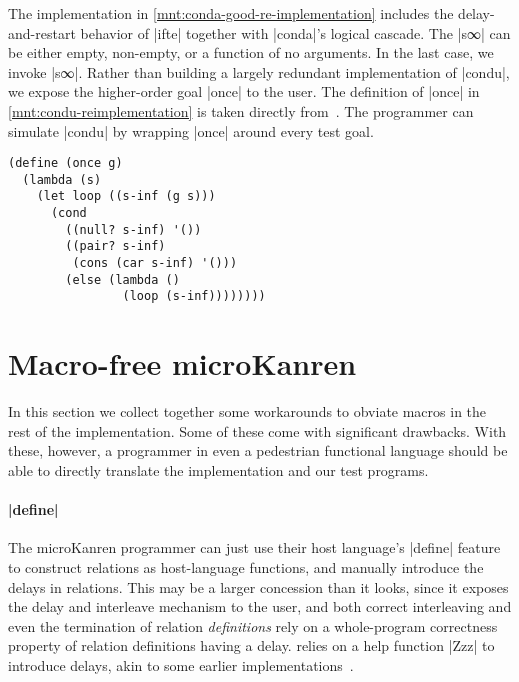 \documentclass[sigplan,draft,natbib=false]{acmart}
\begin{document}
The implementation in \cref{mnt:conda-good-re-implementation} includes
the delay-and-restart behavior of \rackinline|ifte| together with
\rackinline|conda|'s logical cascade. The \rackinline|s∞| can be
either empty, non-empty, or a function of no arguments. In the last
case, we invoke \rackinline|s∞|. Rather than building a largely
redundant implementation of \rackinline|condu|, we expose the
higher-order goal \rackinline|once| to the user. The definition of
\rackinline|once| in \cref{mnt:condu-reimplementation} is taken
directly from~\cite{friedman2018reasoned}. The programmer can simulate
\rackinline|condu| by wrapping \rackinline|once| around every test
goal.

\begin{listing}
  \begin{verbatim}
(define (once g)
  (lambda (s)
    (let loop ((s-inf (g s)))
      (cond
        ((null? s-inf) '())
        ((pair? s-inf)
         (cons (car s-inf) '()))
        (else (lambda ()
                (loop (s-inf))))))))
  \end{verbatim}
  \caption{The \rackinline|once| function}
  \label{mnt:condu-reimplementation}
\end{listing}


\section{Macro-free microKanren}\label{sec:functional}

In this section we collect together some workarounds to obviate macros
in the rest of the implementation. Some of these come with significant
drawbacks. With these, however, a programmer in even a pedestrian
functional language should be able to directly translate the
implementation and our test programs.

\paragraph{\rackinline|define|} The microKanren programmer can just
use their host language's \rackinline|define| feature to construct
relations as host-language functions, and manually introduce the
delays in relations. This may be a larger concession than it looks,
since it exposes the delay and interleave mechanism to the user, and
both correct interleaving and even the termination of relation
\emph{definitions} rely on a whole-program correctness property of
relation definitions having a delay.  relies on a
help function \rackinline|Zzz| to introduce delays, akin to some
earlier implementations~\cite{hemann2013muKanren}.
\end{document}
